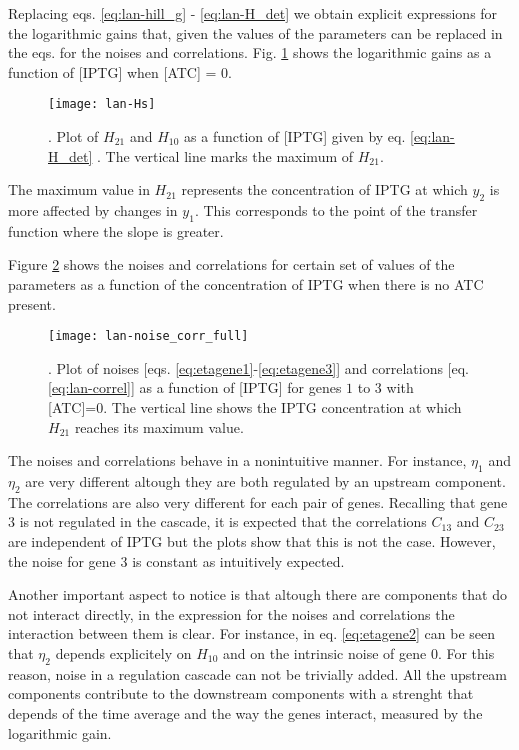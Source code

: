 Replacing eqs. \eqref{eq:lan-hill_g} - \eqref{eq:lan-H_det} we obtain explicit expressions for the logarithmic gains that, given the values of the parameters can be replaced in the eqs. for the noises and correlations. Fig. \ref{fig:lan-Hs} shows the logarithmic gains as a function of [IPTG] when [ATC] = 0.

\begin{figure}[H]
  \centering
  \texttt{[image: lan-Hs]}
  \caption[Logarithmic gains for the genes of a cascade of regulation]{\label{fig:lan-Hs}. Plot of $H_{21}$ and $H_{10}$ as a function of [IPTG] given by eq. \eqref{eq:lan-H_det} . The vertical line marks the maximum of $H_{21}$.}
\end{figure}

The maximum value in $H_{21}$ represents the concentration of IPTG at which $y_2$ is more affected by changes in $y_1$. This corresponds to the point of the transfer function where the slope is greater.

Figure \ref{fig:lan-noise_corr_full} shows the noises and correlations for certain set of values of the parameters as a function of the concentration of IPTG when there is no ATC present.

\begin{figure}[H]
  \centering
  \texttt{[image: lan-noise\_corr\_full]}
  \caption[Noises and correlation for the genes of a cascade of regulation]{\label{fig:lan-noise_corr_full}. Plot of noises [eqs. \eqref{eq:etagene1}-\eqref{eq:etagene3}] and correlations [eq. \eqref{eq:lan-correl}] as a function of [IPTG] for genes $1$ to $3$ with [ATC]=0. The vertical line shows the IPTG concentration at which $H_{21}$ reaches its maximum value.}
\end{figure}

The noises and correlations behave in a nonintuitive manner. For instance, $\eta_1$ and $\eta_2$ are very different altough they are both regulated by an upstream component. The correlations are also very different for each pair of genes. Recalling that gene $3$ is not regulated in the cascade, it is expected that the correlations $C_{13}$ and $C_{23}$ are independent of IPTG but the plots show that this is not the case. However, the noise for gene $3$ is constant as intuitively expected.

Another important aspect to notice is that altough there are components that do not interact directly, in the expression for the noises and correlations the interaction between them is clear. For instance, in eq. \eqref{eq:etagene2} can be seen that $\eta_2$ depends explicitely on $H_{10}$ and on the intrinsic noise of gene $0$. For this reason, noise in a regulation cascade can not be trivially added. All the upstream components contribute to the downstream components with a strenght that depends of the time average and the way the genes interact, measured by the logarithmic gain.

